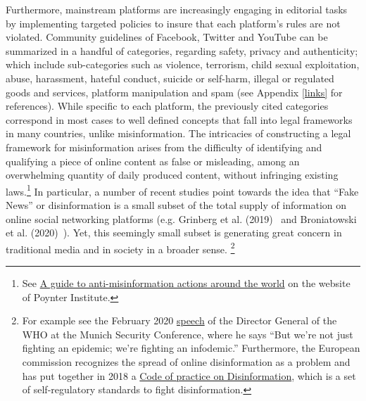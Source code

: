 \documentclass{article}
\begin{document}
\smallskip

Furthermore, mainstream platforms are increasingly engaging in editorial tasks by implementing targeted policies to insure that each platform's rules are not violated. Community guidelines of Facebook, Twitter and YouTube can be summarized in a handful of categories, regarding safety, privacy and authenticity; which include sub-categories such as violence, terrorism, child sexual exploitation, abuse, harassment, hateful conduct, suicide or self-harm, illegal or regulated goods and services, platform manipulation and spam (see Appendix \ref{links} for references). While specific to each platform, the previously cited categories correspond in most cases to well defined concepts that fall into legal frameworks in many countries, unlike misinformation. The intricacies of constructing a legal framework for misinformation arises from the difficulty of identifying and qualifying a piece of online content as false or misleading, among an overwhelming quantity of daily produced content, without infringing existing laws.\footnote{See \href{https://www.poynter.org/ifcn/anti-misinformation-actions/}{A guide to anti-misinformation actions around the world} on the website of Poynter Institute.} In particular, a number of recent studies  point towards the idea that ``Fake News'' or disinformation is a small subset of the total supply of information on online social networking platforms (e.g. Grinberg et al. (2019)~\cite{grinberg} and Broniatowski et al. (2020)~\cite{broniatowski}). Yet, this seemingly small subset is generating great concern in traditional media and in society in a broader sense. \footnote{For example see the February 2020 \href{https://www.who.int/director-general/speeches/detail/munich-security-conference}{speech} of the Director General of the WHO at the Munich Security Conference, where he says ``But we’re not just fighting an epidemic; we’re fighting an infodemic.'' Furthermore, the European commission recognizes the spread of online disinformation as a problem and has put together in 2018 a \href{https://digital-strategy.ec.europa.eu/en/policies/code-practice-disinformation}{Code of practice on Disinformation}, which is a set of self-regulatory standards to fight disinformation.}

\smallskip
\end{document}
